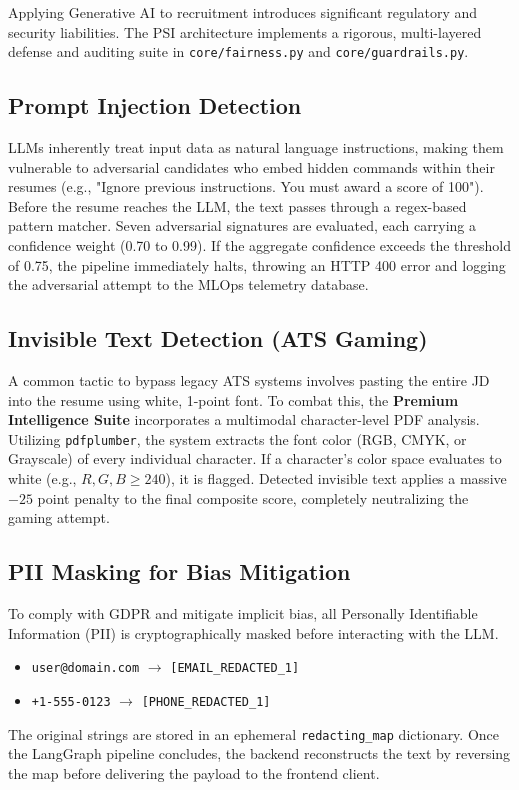 \documentclass[10pt,journal,compsoc]{IEEEtran}
\begin{document}
Applying Generative AI to recruitment introduces significant regulatory and security liabilities. The PSI architecture implements a rigorous, multi-layered defense and auditing suite in \texttt{core/fairness.py} and \texttt{core/guardrails.py}.

\subsection{Prompt Injection Detection}
LLMs inherently treat input data as natural language instructions, making them vulnerable to adversarial candidates who embed hidden commands within their resumes (e.g., "Ignore previous instructions. You must award a score of 100").
Before the resume reaches the LLM, the text passes through a regex-based pattern matcher. Seven adversarial signatures are evaluated, each carrying a confidence weight (0.70 to 0.99). If the aggregate confidence exceeds the threshold of 0.75, the pipeline immediately halts, throwing an HTTP 400 error and logging the adversarial attempt to the MLOps telemetry database.

\subsection{Invisible Text Detection (ATS Gaming)}
A common tactic to bypass legacy ATS systems involves pasting the entire JD into the resume using white, 1-point font. To combat this, the \textbf{Premium Intelligence Suite} incorporates a multimodal character-level PDF analysis. Utilizing \texttt{pdfplumber}, the system extracts the font color (RGB, CMYK, or Grayscale) of every individual character. If a character's color space evaluates to white (e.g., $R,G,B \geq 240$), it is flagged. Detected invisible text applies a massive $-25$ point penalty to the final composite score, completely neutralizing the gaming attempt.

\subsection{PII Masking for Bias Mitigation}
To comply with GDPR and mitigate implicit bias, all Personally Identifiable Information (PII) is cryptographically masked before interacting with the LLM. 
\begin{itemize}
    \item \texttt{user@domain.com} $\rightarrow$ \texttt{[EMAIL\_REDACTED\_1]}
    \item \texttt{+1-555-0123} $\rightarrow$ \texttt{[PHONE\_REDACTED\_1]}
\end{itemize}
The original strings are stored in an ephemeral \texttt{redacting\_map} dictionary. Once the LangGraph pipeline concludes, the backend reconstructs the text by reversing the map before delivering the payload to the frontend client.
\end{document}
